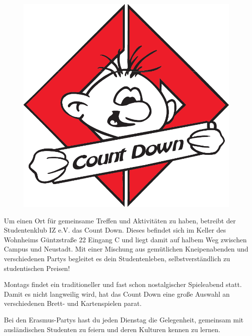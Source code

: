 \begin{figure}%
  \vspace{-.5cm}
  \includegraphics[width=\linewidth]{img/countdown}
  \vspace{-1cm}
\end{figure}

Um einen Ort für gemeinsame Treffen und Aktivitäten zu haben, betreibt der Studentenklub IZ e.V. das Count Down.
Dieses befindet sich im Keller des Wohnheims Güntzstraße 22 Eingang C und liegt damit auf halbem Weg zwischen Campus und Neustadt.
Mit einer Mischung aus gemütlichen Kneipenabenden und verschiedenen Partys begleitet es dein Studentenleben, selbstverständlich zu studentischen Preisen!

Montags findet ein traditioneller und fast schon nostalgischer Spieleabend statt.
Damit es nicht langweilig wird, hat das Count Down eine große Auswahl an verschiedenen Brett- und Kartenspielen parat.

Bei den Erasmus-Partys hast du jeden Dienstag die Gelegenheit, gemeinsam mit ausländischen Studenten zu feiern und deren Kulturen kennen zu lernen.

